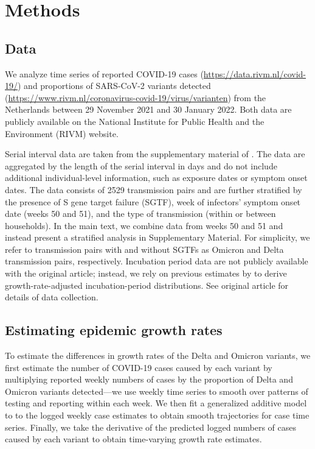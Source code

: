 \documentclass[12pt]{article}
\begin{document}
\section{Methods}

\subsection{Data}

We analyze time series of reported COVID-19 cases (\url{https://data.rivm.nl/covid-19/}) and proportions of SARS-CoV-2 variants detected (\url{https://www.rivm.nl/coronavirus-covid-19/virus/varianten}) from the Netherlands between 29 November 2021 and 30 January 2022.
Both data are publicly available on the National Institute for Public Health and the Environment (RIVM) website.

Serial interval data are taken from the supplementary material of \cite{backer2021omicron}.
The data are aggregated by the length of the serial interval in days and do not include additional individual-level information, such as exposure dates or symptom onset dates.
The data consists of 2529 transmission pairs and are further stratified by the presence of S gene target failure (SGTF), week of infectors' symptom onset date (weeks 50 and 51), and the type of transmission (within or between households).
In the main text, we combine data from weeks 50 and 51 and instead present a stratified analysis in Supplementary Material.
For simplicity, we refer to transmission pairs with and without SGTFs as Omicron and Delta transmission pairs, respectively.
Incubation period data are not publicly available with the original article; instead, we rely on previous estimates by \cite{backer2021omicron} to derive growth-rate-adjusted incubation-period distributions.
See original article for details of data collection.

\subsection{Estimating epidemic growth rates}

To estimate the differences in growth rates of the Delta and Omicron variants, we first estimate the number of COVID-19 cases caused by each variant by multiplying reported weekly numbers of cases by the proportion of Delta and Omicron variants detected---we use weekly time series to smooth over patterns of testing and reporting within each week. 
We then fit a generalized additive model \citep{wood2001mgcv} to to the logged weekly case estimates to obtain smooth trajectories for case time series.
Finally, we take the derivative of the predicted logged numbers of cases caused by each variant to obtain time-varying growth rate estimates.
\end{document}
